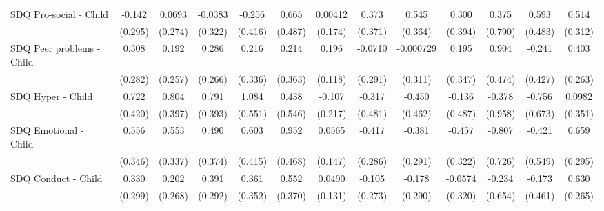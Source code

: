 {\begin{tabular}{l*{12}{c}}
\addlinespace
SDQ Pro-social - Child&      -0.142         &      0.0693         &     -0.0383         &      -0.256         &       0.665         &     0.00412         &       0.373         &       0.545         &       0.300         &       0.375         &       0.593         &       0.514         \\
            &     (0.295)         &     (0.274)         &     (0.322)         &     (0.416)         &     (0.487)         &     (0.174)         &     (0.371)         &     (0.364)         &     (0.394)         &     (0.790)         &     (0.483)         &     (0.312)         \\
\addlinespace
SDQ Peer problems - Child&       0.308         &       0.192         &       0.286         &       0.216         &       0.214         &       0.196         &     -0.0710         &   -0.000729         &       0.195         &       0.904         &      -0.241         &       0.403         \\
            &     (0.282)         &     (0.257)         &     (0.266)         &     (0.336)         &     (0.363)         &     (0.118)         &     (0.291)         &     (0.311)         &     (0.347)         &     (0.474)         &     (0.427)         &     (0.263)         \\
\addlinespace
SDQ Hyper - Child&       0.722         &       0.804\sym{*}  &       0.791\sym{*}  &       1.084\sym{*}  &       0.438         &      -0.107         &      -0.317         &      -0.450         &      -0.136         &      -0.378         &      -0.756         &      0.0982         \\
            &     (0.420)         &     (0.397)         &     (0.393)         &     (0.551)         &     (0.546)         &     (0.217)         &     (0.481)         &     (0.462)         &     (0.487)         &     (0.958)         &     (0.673)         &     (0.351)         \\
\addlinespace
SDQ Emotional - Child&       0.556         &       0.553         &       0.490         &       0.603         &       0.952\sym{*}  &      0.0565         &      -0.417         &      -0.381         &      -0.457         &      -0.807         &      -0.421         &       0.659\sym{*}  \\
            &     (0.346)         &     (0.337)         &     (0.374)         &     (0.415)         &     (0.468)         &     (0.147)         &     (0.286)         &     (0.291)         &     (0.322)         &     (0.726)         &     (0.549)         &     (0.295)         \\
\addlinespace
SDQ Conduct - Child&       0.330         &       0.202         &       0.391         &       0.361         &       0.552         &      0.0490         &      -0.105         &      -0.178         &     -0.0574         &      -0.234         &      -0.173         &       0.630\sym{*}  \\
            &     (0.299)         &     (0.268)         &     (0.292)         &     (0.352)         &     (0.370)         &     (0.131)         &     (0.273)         &     (0.290)         &     (0.320)         &     (0.654)         &     (0.461)         &     (0.265)         \\
\bottomrule
\end{tabular}
}
